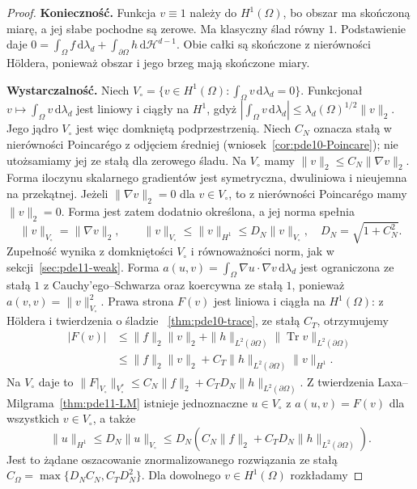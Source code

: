 \begin{proof}
\textbf{Konieczność.} Funkcja $v\equiv1$ należy do $H^1(\Omega)$,
bo obszar ma skończoną miarę, a jej słabe pochodne
są zerowe. Ma klasyczny ślad równy $1$.
Podstawienie daje $0=\int_\Omega f\,\mathrm d\lambda_d
+\int_{\partial\Omega}h\,\mathrm d\mathcal H^{d-1}$.
Obie całki są skończone z nierówności Höldera, ponieważ
obszar i jego brzeg mają skończone miary.

\textbf{Wystarczalność.} Niech
$V_\circ=\{v\in H^1(\Omega):\int_\Omega v\,\mathrm d\lambda_d=0\}$.
Funkcjonał $v\mapsto\int_\Omega v\,\mathrm d\lambda_d$
jest liniowy i ciągły na $H^1$, gdyż
$|\int_\Omega v\,\mathrm d\lambda_d|
\le\lambda_d(\Omega)^{1/2}\|v\|_2$.
Jego jądro $V_\circ$ jest więc domkniętą podprzestrzenią.
Niech $C_N$ oznacza stałą w nierówności Poincarégo
z odjęciem średniej (wniosek~\ref{cor:pde10-Poincare});
nie utożsamiamy jej ze stałą dla zerowego śladu.
Na $V_\circ$ mamy $\|v\|_2\le C_N\|\nabla v\|_2$.
Forma iloczynu skalarnego gradientów jest symetryczna,
dwuliniowa i nieujemna na przekątnej.
Jeżeli $\|\nabla v\|_2=0$ dla $v\in V_\circ$, to
z nierówności Poincarégo mamy $\|v\|_2=0$.
Forma jest zatem dodatnio określona, a jej norma spełnia
\[
 \|v\|_{V_\circ}=\|\nabla v\|_2,\qquad
 \|v\|_{V_\circ}\le\|v\|_{H^1}
 \le D_N\|v\|_{V_\circ},\quad D_N=\sqrt{1+C_N^2}.
\]
Zupełność wynika z domkniętości $V_\circ$ i równoważności
norm, jak w sekcji~\ref{sec:pde11-weak}.
Forma $a(u,v)=\int_\Omega\nabla u\cdot\nabla v\,
\mathrm d\lambda_d$ jest ograniczona ze stałą $1$
z Cauchy'ego--Schwarza oraz koercywna ze stałą $1$,
ponieważ $a(v,v)=\|v\|_{V_\circ}^2$.
Prawa strona $F(v)$ jest liniowa i ciągła na $H^1(\Omega)$:
z Höldera i twierdzenia o śladzie
~\ref{thm:pde10-trace}, ze stałą $C_T$, otrzymujemy
\[
 \begin{aligned}
 |F(v)|&\le\|f\|_2\|v\|_2+
      \|h\|_{L^2(\partial\Omega)}
        \|\operatorname{Tr}v\|_{L^2(\partial\Omega)}\\
 &\le\|f\|_2\|v\|_2+
      C_T\|h\|_{L^2(\partial\Omega)}\|v\|_{H^1}.
 \end{aligned}
\]
Na $V_\circ$ daje to
$\|F|_{V_\circ}\|_{V_\circ^*}
\le C_N\|f\|_2+C_T D_N\|h\|_{L^2(\partial\Omega)}$.
Z twierdzenia Laxa--Milgrama~\ref{thm:pde11-LM}
istnieje jednoznaczne $u\in V_\circ$ z $a(u,v)=F(v)$
dla wszystkich $v\in V_\circ$, a także
\[
 \|u\|_{H^1}\le D_N\|u\|_{V_\circ}
 \le D_N(C_N\|f\|_2+C_T D_N\|h\|_{L^2(\partial\Omega)}).
\]
Jest to żądane oszacowanie znormalizowanego rozwiązania
ze stałą $C_\Omega=\max\{D_N C_N,C_T D_N^2\}$.
Dla dowolnego $v\in H^1(\Omega)$ rozkładamy

\end{proof}
